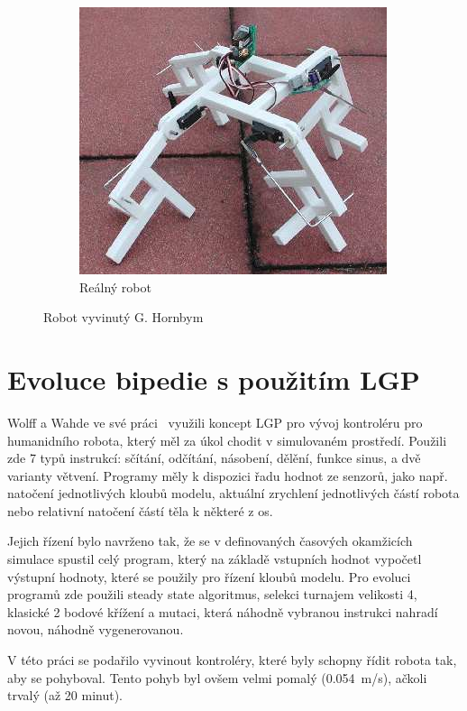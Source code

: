 \begin{figure}
\begin{subfigure}{.33\textwidth}
        \centering
        \includegraphics[width=.9\linewidth]{obrazky/hornby_model_1_real.png}
        \caption{Reálný robot}
        \label{fig:hornby_roboti_real}
    \end{subfigure}
    \caption{Robot vyvinutý G. Hornbym}
    \label{fig:hornby_roboti}
\end{figure}

\section{Evoluce bipedie s použitím LGP}
Wolff a Wahde ve své práci~\cite{Wolff2007} využili koncept LGP pro vývoj kontroléru pro humanidního robota, který měl za úkol chodit v simulovaném prostředí.
Použili zde 7 typů instrukcí: sčítání, odčítání, násobení, dělění, funkce sinus, a dvě varianty větvení.
Programy měly k dispozici řadu hodnot ze senzorů, jako např. natočení jednotlivých kloubů modelu, aktuální zrychlení jednotlivých částí robota nebo relativní natočení částí těla k některé z os.

Jejich řízení bylo navrženo tak, že se v definovaných časových okamžicích simulace spustil celý program, který na základě vstupních hodnot vypočetl výstupní hodnoty, které se použily pro řízení kloubů modelu.
Pro evoluci programů zde použili steady state algoritmus, selekci turnajem velikosti 4, klasické 2 bodové křížení a mutaci, která náhodně vybranou instrukci nahradí novou, náhodně vygenerovanou.

V této práci se podařilo vyvinout kontroléry, které byly schopny řídit robota tak, aby se pohyboval.
Tento pohyb byl ovšem velmi pomalý (0.054~m/s), ačkoli trvalý (až 20 minut).


